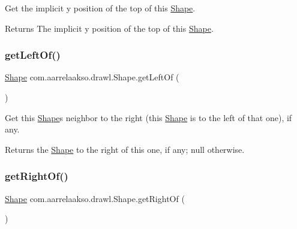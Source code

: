 Get the implicit y position of the top of this \hyperlink{classcom_1_1aarrelaakso_1_1drawl_1_1_shape}{Shape}.

\begin{DoxyReturn}{Returns}
The implicit y position of the top of this \hyperlink{classcom_1_1aarrelaakso_1_1drawl_1_1_shape}{Shape}. 
\end{DoxyReturn}
\mbox{\label{classcom_1_1aarrelaakso_1_1drawl_1_1_shape_a2b19d5964ac46d545a7bae3133df6532}} 
\subsubsection{\texorpdfstring{get\+Left\+Of()}{getLeftOf()}}
{\footnotesize\ttfamily \hyperlink{classcom_1_1aarrelaakso_1_1drawl_1_1_shape}{Shape} com.\+aarrelaakso.\+drawl.\+Shape.\+get\+Left\+Of (\begin{DoxyParamCaption}{ }\end{DoxyParamCaption})\hspace{0.3cm}{\ttfamily [inherited]}}

Get this \hyperlink{classcom_1_1aarrelaakso_1_1drawl_1_1_shape}{Shape}\textquotesingle{}s neighbor to the right (this \hyperlink{classcom_1_1aarrelaakso_1_1drawl_1_1_shape}{Shape} is to the left of that one), if any.

\begin{DoxyReturn}{Returns}
the \hyperlink{classcom_1_1aarrelaakso_1_1drawl_1_1_shape}{Shape} to the right of this one, if any; {\ttfamily null} otherwise. 
\end{DoxyReturn}
\mbox{\label{classcom_1_1aarrelaakso_1_1drawl_1_1_shape_a1ad573b06f341aa79f6a255a476ae6e4}} 
\subsubsection{\texorpdfstring{get\+Right\+Of()}{getRightOf()}}
{\footnotesize\ttfamily \hyperlink{classcom_1_1aarrelaakso_1_1drawl_1_1_shape}{Shape} com.\+aarrelaakso.\+drawl.\+Shape.\+get\+Right\+Of (\begin{DoxyParamCaption}{ }\end{DoxyParamCaption})\hspace{0.3cm}{\ttfamily [inherited]}}

